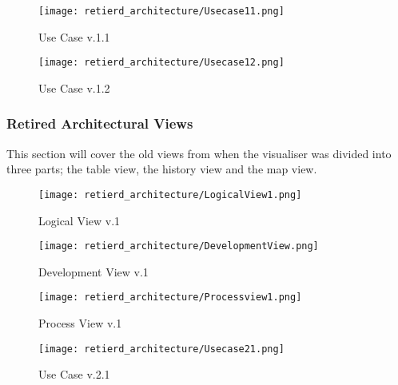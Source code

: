 \documentclass[../document]{subfiles}
\begin{document}
\begin{figure}[H]
	\centering
	\texttt{[image: retierd\_architecture/Usecase11.png]}
	\caption{Use Case v.1.1}
\end{figure}

\begin{figure}[H]
	\centering
	\texttt{[image: retierd\_architecture/Usecase12.png]}
	\caption{Use Case v.1.2}
\end{figure}

\subsubsection{Retired Architectural Views}
\label{retierd_architectural_views}
This section will cover the old views from when the visualiser was divided into three parts; the table view, the history view and the map view. 


\begin{figure}[H]
	\centering
	\texttt{[image: retierd\_architecture/LogicalView1.png]}
	\caption{Logical View v.1}
\end{figure}

\begin{figure}[H]
	\centering
	\texttt{[image: retierd\_architecture/DevelopmentView.png]}
	\caption{Development View v.1}
\end{figure}


\begin{figure}[H]
	\centering
	\texttt{[image: retierd\_architecture/Processview1.png]}
	\caption{Process View v.1}
\end{figure}

\begin{figure}[H]
	\centering
	\texttt{[image: retierd\_architecture/Usecase21.png]}
	\caption{Use Case v.2.1}
\end{figure}
\end{document}
